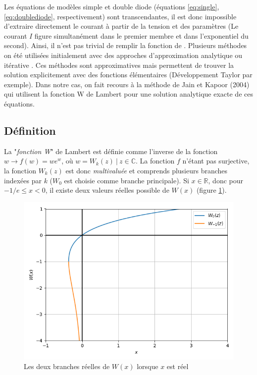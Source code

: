 Les équations de modèles simple et double diode (équations \ref{eq:single}, \ref{eq:doublediode}, respectivement) sont transcendantes, il est donc impossible d'extraire directement le courant à partir de la tension et des paramètres (Le courant $I$ figure simultanément dans le premier membre et dans l'exponentiel du second). Ainsi, il n'est pas trivial de remplir la fonction de . Plusieurs méthodes on été utilisées initialement avec des approches d'approximation analytique ou itérative \cite{Shur1991,AbuelmaAtti1992,Datta1992}. Ces méthodes sont approximatives mais permettent de trouver la solution explicitement avec des fonctions élémentaires (Développement Taylor par exemple). Dans notre cas, on fait recours à la méthode de Jain et Kapoor (2004) \cite{Jain2004, Lun2015} qui utilisent la fonction W de Lambert pour une solution analytique exacte de ces équations.

\subsection{Définition}
La "\textit{fonction W}" de Lambert est définie comme l'inverse de la fonction $w \rightarrow f(w) =  w e^w$, où $w = W_k(z)\ |\ z \in \mathbb{C}$. La fonction $f$ n'étant pas surjective, la fonction $W_k(z)$ est donc \textit{multivaluée} et comprends plusieurs branches indexées par $k$ ($W_0$ est choisie comme branche principale). Si $x \in \mathbb{R}$, donc pour $-1/e \leq x < 0$, il existe deux valeurs réelles possible de $W(x)$ (figure \ref{fig:lambertw}).

\begin{figure} 
  \begin{center}
    \includegraphics[width=.6\textwidth]{resources/lambertw.png}
    \caption{Les deux branches réelles de $W(x)$ lorsque $x$ est réel}
    \label{fig:lambertw}
  \end{center}
\end{figure}

